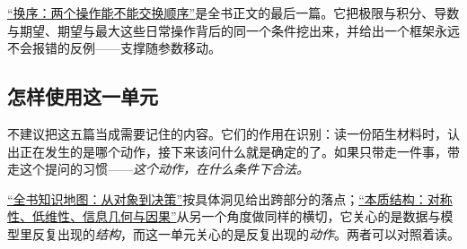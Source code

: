 \hyperref[sec:18-Synthesis/02-Recurring-Ideas/05]{``换序：两个操作能不能交换顺序''}是全书正文的最后一篇。它把极限与积分、导数与期望、期望与最大这些日常操作背后的同一个条件挖出来，并给出一个框架永远不会报错的反例——支撑随参数移动。

\subsection{怎样使用这一单元}

不建议把这五篇当成需要记住的内容。它们的作用在识别：读一份陌生材料时，认出正在发生的是哪个动作，接下来该问什么就是确定的了。如果只带走一件事，带走这个提问的习惯——\emph{这个动作，在什么条件下合法。}

\hyperref[ch:002]{``全书知识地图：从对象到决策''}按具体洞见给出跨部分的落点；\hyperref[ch:106]{``本质结构：对称性、低维性、信息几何与因果''}从另一个角度做同样的横切，它关心的是数据与模型里反复出现的\emph{结构}，而这一单元关心的是反复出现的\emph{动作}。两者可以对照着读。
